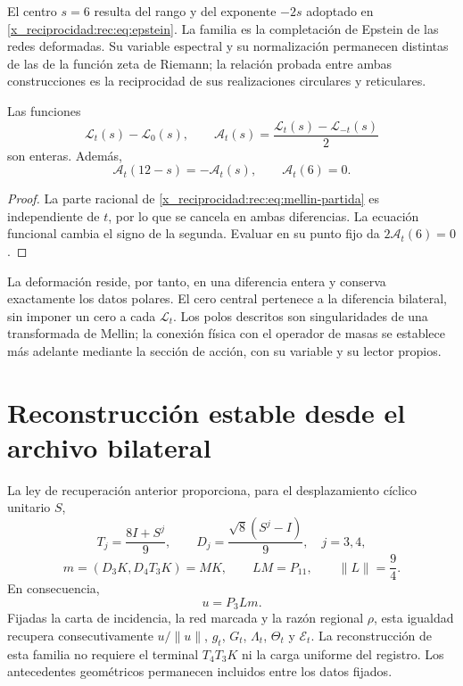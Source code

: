 El centro \(s=6\) resulta del rango y del exponente \(-2s\) adoptado en \eqref{x_reciprocidad:rec:eq:epstein}. La familia es la completación de Epstein de las redes deformadas. Su variable espectral y su normalización permanecen distintas de las de la función zeta de Riemann; la relación probada entre ambas construcciones es la reciprocidad de sus realizaciones circulares y reticulares.

\begin{corollary}
\label{x_reciprocidad:rec:cor:polar}
Las funciones
\[
 \mathcal L_t(s)-\mathcal L_0(s),\qquad
 \mathcal A_t(s)=\frac{\mathcal L_t(s)-\mathcal L_{-t}(s)}2
\]
son enteras. Además,
\[
 \mathcal A_t(12-s)=-\mathcal A_t(s),\qquad \mathcal A_t(6)=0.
\]
\end{corollary}
\begin{proof}
La parte racional de \eqref{x_reciprocidad:rec:eq:mellin-partida} es independiente de \(t\), por lo que se cancela en ambas diferencias. La ecuación funcional cambia el signo de la segunda. Evaluar en su punto fijo da \(2\mathcal A_t(6)=0\).
\end{proof}

La deformación reside, por tanto, en una diferencia entera y conserva exactamente los datos polares. El cero central pertenece a la diferencia bilateral, sin imponer un cero a cada \(\mathcal L_t\). Los polos descritos son singularidades de una transformada de Mellin; la conexión física con el operador de masas se establece más adelante mediante la sección de acción, con su variable y su lector propios.

\section{Reconstrucción estable desde el archivo bilateral}
\label{x_reciprocidad:rec:archivo}

La ley de recuperación anterior proporciona, para el desplazamiento cíclico unitario \(S\),
\[
 T_j=\frac{8I+S^j}{9},\qquad D_j=\frac{\sqrt8(S^j-I)}9,
 \quad j=3,4,
\]
\begin{equation}
 m=(D_3K,D_4T_3K)=MK,\qquad LM=P_{11},\qquad\|L\|=\frac94.
 \label{x_reciprocidad:rec:eq:archivo}
\end{equation}
En consecuencia,
\begin{equation}
 u=P_3Lm.
 \label{x_reciprocidad:rec:eq:recuperacion-u}
\end{equation}
Fijadas la carta de incidencia, la red marcada y la razón regional \(\rho\), esta igualdad recupera consecutivamente \(u/\|u\|\), \(g_t\), \(G_t\), \(\Lambda_t\), \(\Theta_t\) y \(\mathcal E_t\). La reconstrucción de esta familia no requiere el terminal \(T_4T_3K\) ni la carga uniforme del registro. Los antecedentes geométricos permanecen incluidos entre los datos fijados.


